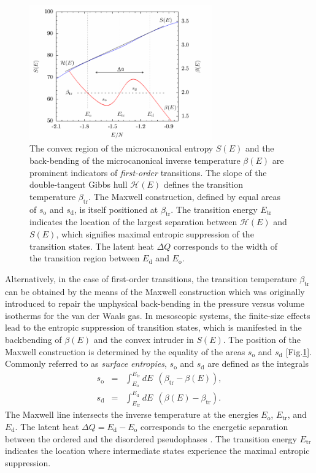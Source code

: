 \documentclass[12pt]{report}
\begin{document}
%
\begin{figure}
\center
\includegraphics[width = 0.7\textwidth]{chapter2Figs/maxwellConstruct.pdf}
\caption{\label{fig:Fig_2}%
The convex region of the microcanonical entropy $S(E)$ and the back-bending of the microcanonical inverse temperature $\beta(E)$ are prominent indicators of \textit{first-order} transitions. The slope of the double-tangent Gibbs hull $\mathcal{H}(E)$ defines the transition temperature $\beta_{\mathrm{tr}}$. The Maxwell construction, defined by equal areas of $s_{\mathrm{o}}$ and $s_{\mathrm{d}}$, is itself positioned at $\beta_{\mathrm{tr}}$. The transition energy $E_{\mathrm{tr}}$ indicates the location of the largest separation between $\mathcal{H}(E)$ and $S(E)$, which signifies maximal entropic suppression of the transition states. The latent heat $\Delta Q$ corresponds to the width of the transition region between $E_{\mathrm{d}}$ and $E_{\mathrm{o}}$.}
\end{figure}
%
Alternatively, in the case of first-order transitions, the transition temperature $\beta_{\mathrm{tr}}$ can be obtained by the means of the Maxwell construction which was originally introduced to repair the unphysical back-bending in the pressure versus volume isotherms for the van der Waals gas. In mesoscopic systems, the finite-size effects lead to the entropic suppression of transition states, which is manifested in the backbending of $\beta(E)$ and the convex intruder in $S(E)$. The position of the Maxwell construction is determined by the equality of the areas $s_{\mathrm{o}}$ and $s_{\mathrm{d}}$ [Fig.\ref{fig:Fig_2}]. Commonly referred to as \textit{surface entropies}, $s_{\mathrm{o}}$ and $s_{\mathrm{d}}$ are defined as the integrals
\begin{eqnarray}
\label{eq:surfaceEntr}
s_{\mathrm{o}} &=& \int_{E_{\mathrm{o}}}^{E_{\mathrm{tr}}} dE \:\: (\beta_{\mathrm{tr}}-\beta(E)), \\
s_{\mathrm{d}} &=& \int_{E_{\mathrm{tr}}}^{E_{\mathrm{d}}} dE \:\: (\beta(E)-\beta_{\mathrm{tr}}).
\end{eqnarray}
The Maxwell line intersects the inverse temperature at the energies $E_{\mathrm{o}}$, $E_{\mathrm{tr}}$, and $E_{\mathrm{d}}$. The latent heat
$\Delta Q = E_{\mathrm{d}} - E_{\mathrm{o}}$ corresponds to the energetic separation between the ordered and the disordered pseudophases . The transition energy $E_{\mathrm{tr}}$ indicates the location where intermediate states experience the maximal entropic suppression\cite{Bachmann2014}.
\end{document}
